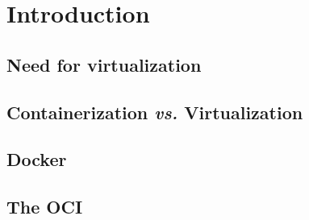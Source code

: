 \section{Introduction}
\label{sec::intro}


\subsection{Need for virtualization}
\label{ssec::intro:need-virt}

\subsection{Containerization \emph{vs.} Virtualization}
\label{ssec::intro:cont-vs-virt}

\subsection{Docker}
\label{ssec::intro:docker}

\subsection{The OCI}
\label{ssec::intro:oci}